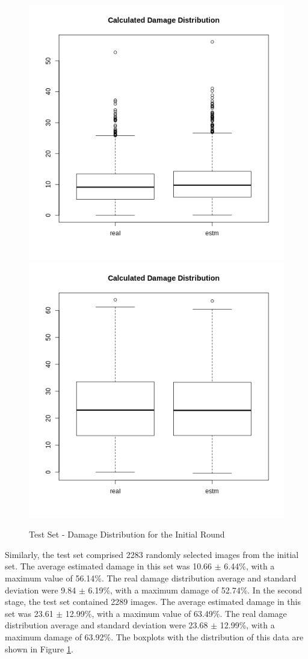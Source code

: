 \begin{figure}[h!]
    \centering
    \includegraphics[width = .45\linewidth]{Figures/v1-tst-dmgdst.png}
    \includegraphics[width = .45\linewidth]{Figures/v2-tst-dmgdst.png}
    \caption{Test Set - Damage Distribution for the Initial Round}
    \label{fig:test_dist}
\end{figure}

Similarly, the test set comprised 2283 randomly selected images from the initial set. The average estimated damage in this set was 10.66 $\pm$ 6.44\%, with a maximum value of 56.14\%. The real damage distribution average and standard deviation were 9.84 $\pm$ 6.19\%, with a maximum damage of 52.74\%. In the second stage, the test set contained 2289 images. The average estimated damage in this set was 23.61 $\pm$ 12.99\%, with a maximum value of 63.49\%. The real damage distribution average and standard deviation were 23.68 $\pm$ 12.99\%, with a maximum damage of 63.92\%. The boxplots with the distribution of this data are shown in Figure \ref{fig:test_dist}.


